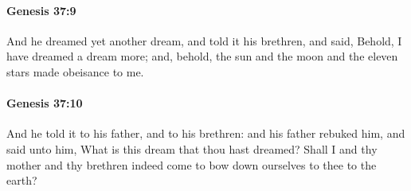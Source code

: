 		\paragraph{Genesis 37:9} %
			\label{GENESIS-37-9}

			And he dreamed yet another dream, and told it his brethren, and said, Behold, I have dreamed a dream more; and, behold, the sun and the moon and the eleven stars made obeisance to me.


		\paragraph{Genesis 37:10} %
			\label{GENESIS-37-10}

			And he told it to his father, and to his brethren: and his father rebuked him, and said unto him, What is this dream that thou hast dreamed? Shall I and thy mother and thy brethren indeed come to bow down ourselves to thee to the earth?

